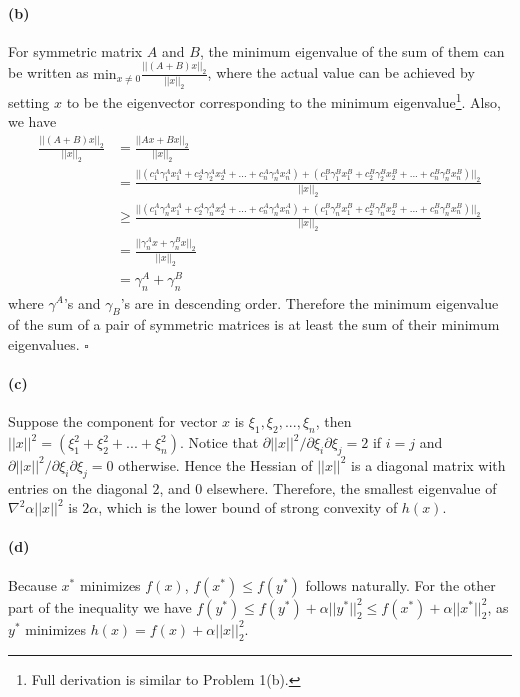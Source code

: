 \documentclass[12pt]{article}
\begin{document}
\paragraph{(b)} For symmetric matrix $A$ and $B$, the minimum eigenvalue of the sum of them can be written as $\text{min}_{x\neq0}\frac{||(A+B)x||_2}{||x||_2} $, where the actual value can be achieved by setting $x$ to be the eigenvector corresponding to the minimum eigenvalue\footnote{Full derivation is similar to Problem 1(b). }. Also, we have
\begin{align*}
\frac{||(A+B)x||_2}{||x||_2} &= \frac{||Ax+Bx||_2}{||x||_2}\\
&=\frac{|| (c^A_1\gamma^A_1x^A_1 + c^A_2\gamma^A_2x^A_2 + ... + c^A_n\gamma^A_nx^A_n) + (c^B_1\gamma^B_1x^B_1 + c^B_2\gamma^B_2x^B_2 + ... + c^B_n\gamma^B_nx^B_n)||_2}{||x||_2} \\
&\geq \frac{|| (c^A_1\gamma^A_nx^A_1 + c^A_2\gamma^A_nx^A_2 + ... + c^A_n\gamma^A_nx^A_n) + (c^B_1\gamma^B_nx^B_1 + c^B_2\gamma^B_nx^B_2 + ... + c^B_n\gamma^B_nx^B_n)||_2}{||x||_2}\\
&=\frac{||\gamma_n^A x + \gamma_n^B x ||_2}{||x||_2}\\
&=\gamma_n^A + \gamma_n^B
\end{align*}
where $\gamma^A$'s and $\gamma_B$'s are in descending order. Therefore the minimum eigenvalue of the sum of a pair of symmetric matrices is at least the sum of their minimum eigenvalues. $\square$

\paragraph{(c)} Suppose the component for vector $x$ is $\xi_1, \xi_2, ..., \xi_n$, then $||x||^2 = (\xi_1^2 + \xi_2^2 + ... + \xi_n^2)$. Notice that $\partial ||x||^2 / \partial \xi_i\partial\xi_j = 2$ if $i = j$ and $\partial ||x||^2 / \partial \xi_i\partial\xi_j = 0$ otherwise. Hence the Hessian of $||x||^2$ is a diagonal matrix with entries on the diagonal $2$, and $0$ elsewhere. Therefore, the smallest eigenvalue of $\nabla^2 \alpha ||x||^2$ is $2\alpha$, which is the lower bound of strong convexity of $h(x)$.

\paragraph{(d)} Because $x^*$ minimizes $f(x)$, $f(x^*) \leq f(y^*)$ follows naturally. For the other part of the inequality we have $f(y^*) \leq f(y^*) + \alpha ||y^*||_2^2 \leq f(x^*) + \alpha ||x^*||_2^2$, as $y^*$ minimizes $h(x) = f(x) + \alpha ||x||^2_2$.
\end{document}
